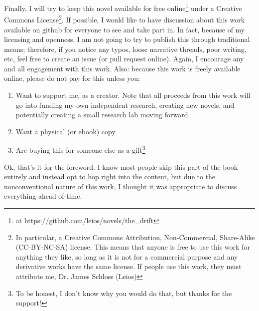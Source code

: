 Finally, I will try to keep this novel available for free online\footnote{at https://github.com/leios/novels/the\_drift} under a Creative Commons License\footnote{In particular, a Creative Commons Attribution, Non-Commercial, Share-Alike (CC-BY-NC-SA) license. This means that anyone is free to use this work for anything they like, so long as it is not for a commercial purpose and any derivative works have the same license.
If people use this work, they must attribute me, Dr. James Schloss (Leios)}.
If possible, I would like to have discussion about this work available on github for everyone to see and take part in.
In fact, because of my licensing and openness, I am not going to try to publish this through traditional means; therefore, if you notice any typos, loose narrative threads, poor writing, etc, feel free to create an issue (or pull request online).
Again, I encourage any and all engagement with this work.
Also: because this work is freely available online, please do not pay for this unless you:
\begin{enumerate}
\item Want to support me, as a creator. Note that all proceeds from this work will go into funding my own independent research, creating new novels, and potentially creating a small research lab moving forward.
\item Want a physical (or ebook) copy
\item Are buying this for someone else as a gift\footnote{To be honest, I don't know why you would do that, but thanks for the support!}
\end{enumerate}

Ok, that's it for the foreword.
I know most people skip this part of the book entirely and instead opt to hop right into the content, but due to the nonconventional nature of this work, I thought it was appropriate to discuss everything ahead-of-time.

